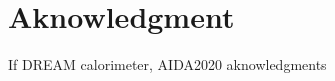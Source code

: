 \documentclass{webofc}
\begin{document}
\section{Aknowledgment}
\label{sec:aknowledgment}

If DREAM calorimeter, AIDA2020 aknowledgments


%
%
%
%
\end{document}
